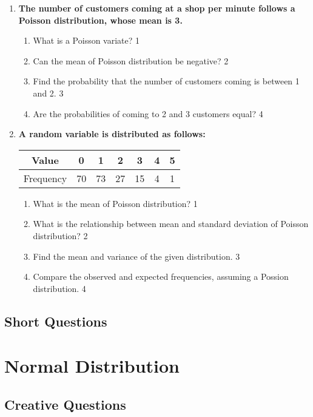 \documentclass[a4paper,oneside, margin=1.4in]{book}
\begin{document}
\begin{enumerate}
  \item
	  \textbf{The number of customers coming at a shop per minute follows a Poisson distribution,  whose mean is 3.} 
  
  \begin{enumerate}
    \item
	What is a Poisson variate? \hfill 1
    \item
	Can the mean of Poisson distribution be negative? \hfill 2
    \item  
	Find the probability that the number of customers coming is between 1 and 2. \hfill 3
    \item
	Are the probabilities of coming to 2 and 3 customers equal?  \hfill 4
  \end{enumerate}

 \item
	  \textbf{A random variable is distributed as follows:} 
	  
	  \begin{table}[h]
	  \centering
\begin{tabular}{ccccccc}
Value & 0 & 1 & 2 & 3 & 4 & 5 \\ \hline
Frequency & 70 & 73 & 27 & 15 & 4 & 1
\end{tabular}
\end{table}
  
  \begin{enumerate}
    \item
	What is the mean of Poisson distribution? \hfill 1
    \item
	What is the relationship between mean and standard deviation of Poisson distribution? \hfill 2
    \item  
	Find the mean and variance of the given distribution. \hfill 3
    \item
	Compare the observed and expected frequencies, assuming a Possion distribution. \hfill 4
  \end{enumerate}

  \end{enumerate}

\section{Short Questions}

\chapter{Normal Distribution} 
\section{Creative Questions}
\end{document}
